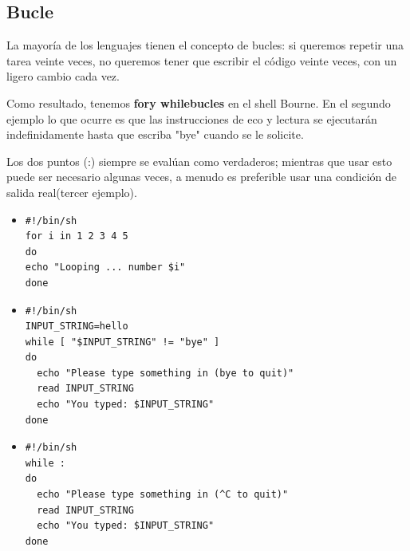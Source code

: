 \documentclass[12pt,letterpaper]{article}
\begin{document}
{        \subsection{Bucle}
        La mayoría de los lenguajes tienen el concepto de bucles: si queremos repetir una tarea veinte veces, no queremos tener que escribir el código veinte veces, con un ligero cambio cada vez. \par
Como resultado, tenemos \textbf{fory whilebucles} en el shell Bourne.
En el segundo ejemplo lo que ocurre es que las instrucciones de eco y lectura se ejecutarán indefinidamente hasta que escriba "bye" cuando se le solicite. \par
Los dos puntos (:) siempre se evalúan como verdaderos; mientras que usar esto puede ser necesario algunas veces, a menudo es preferible usar una condición de salida real(tercer ejemplo). 
		\color{red}
        \begin{itemize}
        \item \begin{verbatim}	
#!/bin/sh
for i in 1 2 3 4 5
do
echo "Looping ... number $i"
done
		\end{verbatim}
        \item \begin{verbatim}
#!/bin/sh
INPUT_STRING=hello
while [ "$INPUT_STRING" != "bye" ]
do
  echo "Please type something in (bye to quit)"
  read INPUT_STRING
  echo "You typed: $INPUT_STRING"
done
        \end{verbatim}
         \item \begin{verbatim}
#!/bin/sh
while :
do
  echo "Please type something in (^C to quit)"
  read INPUT_STRING
  echo "You typed: $INPUT_STRING"
done
        \end{verbatim}
        \end{itemize}
        \color{black}
}
\end{document}
